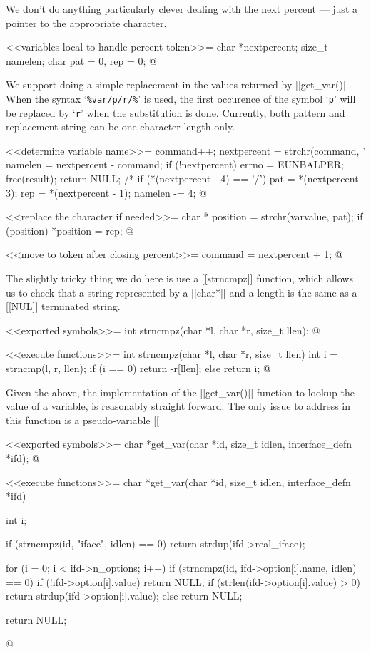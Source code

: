\documentclass{article}
\begin{document}
We don't do anything particularly clever dealing with the next percent
--- just a pointer to the appropriate character.

<<variables local to handle percent token>>=
char *nextpercent;
size_t namelen;
char pat = 0, rep = 0;
@ 

We support doing a simple replacement in the values returned by [[get_var()]].
When the syntax `\verb!%var/p/r/%!' is used, the first occurence of the
symbol `\verb!p!' will be replaced by `\verb!r!' when the substitution
is done. Currently, both pattern and replacement string can be one character
length only.

<<determine variable name>>=
command++;
nextpercent = strchr(command, '%
namelen = nextpercent - command;
if (!nextpercent) {
	errno = EUNBALPER;
	free(result);
	return NULL;
}
/* %
if (*(nextpercent - 4) == '/') {
	pat = *(nextpercent - 3);
	rep = *(nextpercent - 1);
	namelen -= 4;
}
@ 

<<replace the character if needed>>=
char * position = strchr(varvalue, pat);
if (position) {
	*position = rep;
}
@ 

<<move to token after closing percent>>=
command = nextpercent + 1;
@

The slightly tricky thing we do here is use a [[strncmpz]] function,
which allows us to check that a string represented by a [[char*]] and
a length is the same as a [[NUL]] terminated string.

<<exported symbols>>=
int strncmpz(char *l, char *r, size_t llen);
@ 

<<execute functions>>=
int strncmpz(char *l, char *r, size_t llen) {
	int i = strncmp(l, r, llen);
	if (i == 0)
		return -r[llen];
	else
		return i;
}
@ 

Given the above, the implementation of the [[get_var()]] function to
lookup the value of a variable, is reasonably straight forward. The
only issue to address in this function is a pseudo-variable
[[%

<<exported symbols>>=
char *get_var(char *id, size_t idlen, interface_defn *ifd);
@ 

<<execute functions>>=
char *get_var(char *id, size_t idlen, interface_defn *ifd) {
	int i;

	if (strncmpz(id, "iface", idlen) == 0) {
		return strdup(ifd->real_iface);
	}

	{
		for (i = 0; i < ifd->n_options; i++) {
			if (strncmpz(id, ifd->option[i].name, idlen) == 0) {
				if (!ifd->option[i].value) {
				    return NULL;
				}
				if (strlen(ifd->option[i].value) > 0) {
					return strdup(ifd->option[i].value);
				} else {
					return NULL;
				}
			}
		}
	}

	return NULL;
}
@ 
\end{document}
